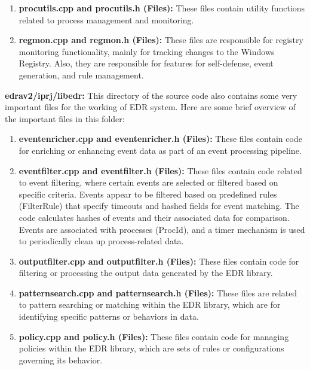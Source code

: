 \documentclass{article}
\begin{document}
\begin{enumerate}
    \item \textbf{procutils.cpp and procutils.h (Files):} These files contain utility functions related to process management and monitoring.
    \item \textbf{regmon.cpp and regmon.h (Files):} These files are responsible for registry monitoring functionality, mainly for tracking changes to the Windows Registry. Also, they are responsible for features for self-defense, event generation, and rule management. \\
\end{enumerate} 

\textbf{edrav2/iprj/libedr:} This directory of the source code also contains some very important files for the working of EDR system. Here are some brief overview of the important files in this folder: \\
\begin{enumerate}
    \item \textbf{eventenricher.cpp and eventenricher.h (Files):} These files contain code for enriching or enhancing event data as part of an event processing pipeline.
    \item \textbf{eventfilter.cpp and eventfilter.h (Files):} These files contain code related to event filtering, where certain events are selected or filtered based on specific criteria. Events appear to be filtered based on predefined rules (FilterRule) that specify timeouts and hashed fields for event matching. The code calculates hashes of events and their associated data for comparison. Events are associated with processes (ProcId), and a timer mechanism is used to periodically clean up process-related data.
    \item \textbf{outputfilter.cpp and outputfilter.h (Files):} These files contain code for filtering or processing the output data generated by the EDR library.
    \item \textbf{patternsearch.cpp and patternsearch.h (Files):} These files are related to pattern searching or matching within the EDR library, which are for identifying specific patterns or behaviors in data.
    \item \textbf{policy.cpp and policy.h (Files):} These files contain code for managing policies within the EDR library, which are sets of rules or configurations governing its behavior.
\end{enumerate}
\end{document}
